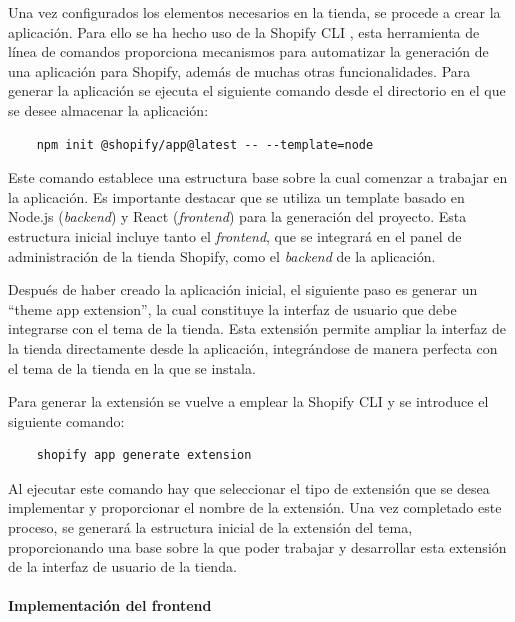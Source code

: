 \documentclass[11pt]{article}
\newcommand{\subsubsubsection}[1]{\paragraph{#1}}
\begin{document}
Una vez configurados los elementos necesarios en la tienda, se procede a crear la aplicación. Para ello se ha hecho uso de la Shopify CLI \cite{shopify-cli}, esta herramienta
de línea de comandos proporciona mecanismos para automatizar la generación de una aplicación para Shopify, además de muchas otras funcionalidades.
Para generar la aplicación se ejecuta el siguiente comando desde el directorio en el que se desee almacenar la aplicación: 
\begin{lstlisting}
    npm init @shopify/app@latest -- --template=node
\end{lstlisting}

Este comando establece una estructura base sobre la cual comenzar a trabajar en la aplicación. Es importante destacar que se utiliza un template 
basado en Node.js (\textit{backend}) y React (\textit{frontend}) para la generación del proyecto. Esta estructura inicial incluye tanto el \textit{frontend}, que se 
integrará en el panel de administración de la tienda Shopify, como el \textit{backend} de la aplicación.

Después de haber creado la aplicación inicial, el siguiente paso es generar un ``theme app extension'',
la cual constituye la interfaz de usuario que debe integrarse con el tema de la tienda. Esta extensión 
permite ampliar la interfaz de la tienda directamente desde la aplicación, integrándose de manera perfecta 
con el tema de la tienda en la que se instala.

Para generar la extensión se vuelve a emplear la Shopify CLI y se introduce el siguiente comando:

\begin{lstlisting}
    shopify app generate extension
\end{lstlisting}

Al ejecutar este comando hay que seleccionar el tipo de extensión que se desea implementar y proporcionar el nombre de la extensión. Una vez completado este proceso,
se generará la estructura inicial de la extensión del tema, proporcionando una base sobre la que poder trabajar y desarrollar esta extensión 
de la interfaz de usuario de la tienda.


\subsubsubsection{Implementación del frontend}
\end{document}
